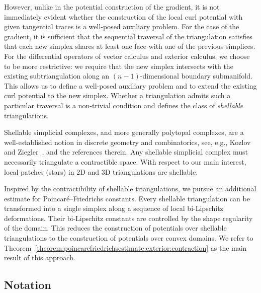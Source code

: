 \documentclass[10pt,a4paper]{article}
\begin{document}

However, unlike in the potential construction of the gradient, it is not immediately evident whether the construction of the local curl potential with given tangential traces is a well-posed auxiliary problem. 
For the case of the gradient, it is sufficient that the sequential traversal of the triangulation satisfies that each new simplex shares at least one face with one of the previous simplices. 
For the differential operators of vector calculus and exterior calculus, we choose to be more restrictive: 
we require that the new simplex intersects with the existing subtriangulation along an $(n-1)$-dimensional boundary submanifold.
This allows us to define a well-posed auxiliary problem and to extend the existing curl potential to the new simplex. 
Whether a triangulation admits such a particular traversal is a non-trivial condition and defines the class of \emph{shellable} triangulations.

 
 
 
 
Shellable simplicial complexes, and more generally polytopal complexes, are a well-established notion in discrete geometry and combinatorics, see, e.g., Kozlov~\cite{kozlov2008combinatorial} and Ziegler~\cite{ziegler1995lectures}, and the references therein.
Any shellable simplicial complex must necessarily triangulate a contractible space. 
With respect to our main interest, local patches (stars) in 2D and 3D triangulations are shellable. 

Inspired by the contractibility of shellable triangulations, we pursue an additional estimate for Poincar\'e--Friedrichs constants. 
Every shellable triangulation can be transformed into a single simplex along a sequence of local bi-Lipschitz deformations. 
Their bi-Lipschitz constants are controlled by the shape regularity of the domain. 
This reduces the construction of potentials over shellable triangulations to the construction of potentials over convex domains.
We refer to Theorem~\ref{theorem:poincarefriedrichsestimate:exterior:contraction} as the main result of this approach. 
















\subsection{Notation}
\end{document}
